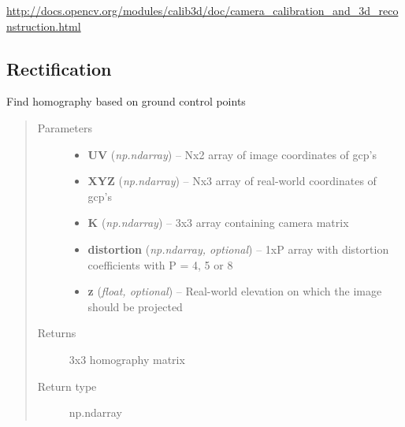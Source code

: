 \documentclass[letterpaper,10pt,english]{sphinxmanual}
\begin{document}


\href{http://docs.opencv.org/modules/calib3d/doc/camera\_calibration\_and\_3d\_reconstruction.html}{http://docs.opencv.org/modules/calib3d/doc/camera\_calibration\_and\_3d\_reconstruction.html}




\subsection{Rectification}
\label{rectification:id1}\label{rectification:module-flamingo.rectification.rectification}

\begin{fulllineitems}
\label{rectification:flamingo.rectification.rectification.find_homography}
Find homography based on ground control points
\begin{quote}\begin{description}
\item[{Parameters}] \leavevmode\begin{itemize}
\item {} 
\textbf{UV} (\emph{np.ndarray}) -- Nx2 array of image coordinates of gcp's

\item {} 
\textbf{XYZ} (\emph{np.ndarray}) -- Nx3 array of real-world coordinates of gcp's

\item {} 
\textbf{K} (\emph{np.ndarray}) -- 3x3 array containing camera matrix

\item {} 
\textbf{distortion} (\emph{np.ndarray, optional}) -- 1xP array with distortion coefficients with P = 4, 5 or 8

\item {} 
\textbf{z} (\emph{float, optional}) -- Real-world elevation on which the image should be projected

\end{itemize}

\item[{Returns}] \leavevmode
3x3 homography matrix

\item[{Return type}] \leavevmode
np.ndarray


\end{description}
\end{quote}
\end{fulllineitems}
\end{document}
